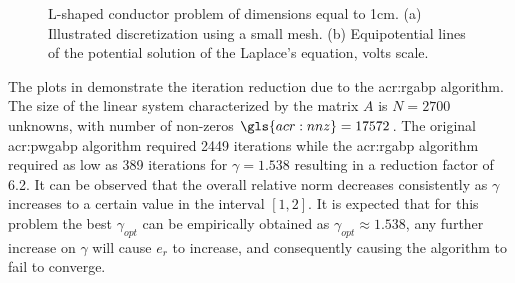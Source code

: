 \begin{figure}[h]
	\centerline{
	\hspace{2em}
	}
	\caption[The L-shaped conductor problem.]{L-shaped conductor problem of dimensions equal to 1cm. (a) Illustrated discretization using a small mesh. (b) Equipotential lines of the potential solution of the Laplace's equation, volts scale.}
	\label{fig:L-shaped}
\end{figure}

The plots in  demonstrate the iteration reduction due to the \gls{acr:rgabp} algorithm.
The  size of the linear system characterized by the matrix $A$ is $N=2700$ unknowns, with number of non-zeros $\gls{acr:nnz} = 17572$.
The original \gls{acr:pwgabp} algorithm required 2449 iterations while the \gls{acr:rgabp} algorithm required as low as 389 iterations for $\gamma = 1.538$ resulting in a reduction factor of 6.2.
It can be observed that the overall relative norm decreases consistently as $\gamma$ increases to a certain value in the interval $[1,2]$.
It is expected that for this problem the best $\gamma_\mathit{opt}$ can be empirically obtained as $\gamma_\mathit{opt} \approx 1.538$, any further increase on $\gamma$ will cause $e_r$ to increase, and consequently causing the algorithm to fail to converge.


